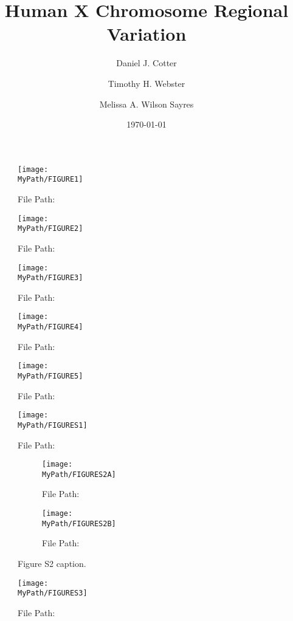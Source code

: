 \documentclass[12pt]{article}
\title{Human X Chromosome Regional Variation}
\author[1]{Daniel J. Cotter}
\author[1]{Timothy H. Webster}
\author[1]{Melissa A. Wilson Sayres}
\affil[1]{Arizona State University}
\date{\today}
\newcommand*{\MyPath}{..}
\newcommand{\beginsupplement}{%
        \setcounter{table}{0}
        \renewcommand{\thetable}{S\arabic{table}}%
        \setcounter{figure}{0}
        \renewcommand{\thefigure}{S\arabic{figure}}%
     }
\begin{document}
\maketitle

\begin{abstract}

\end{abstract}

\begin{figure}
  \texttt{[image: \\MyPath/FIGURE1]}
  \caption{File Path: {\tiny\texttt{}}}
  \label{fig:fig1}
\end{figure}

\begin{figure}
  \texttt{[image: \\MyPath/FIGURE2]}
  \caption{File Path: {\tiny\texttt{}}}
  \label{fig:fig2}
\end{figure}

\begin{figure}
  \texttt{[image: \\MyPath/FIGURE3]}
  \caption{File Path: {\tiny\texttt{}}}
  \label{fig:fig3}
\end{figure}

\begin{figure}
  \texttt{[image: \\MyPath/FIGURE4]}
  \caption{File Path: {\tiny\texttt{}}}
  \label{fig:fig4}
\end{figure}

\begin{figure}
  \texttt{[image: \\MyPath/FIGURE5]}
  \caption{File Path: {\tiny\texttt{}}}
  \label{fig:fig5}
\end{figure}

\beginsupplement

\begin{figure}
  \texttt{[image: \\MyPath/FIGURES1]}
  \caption{File Path: {\tiny\texttt{}}}
  \label{fig:figS1}
\end{figure}

\begin{figure}[h!]
  \centering
  \begin{subfigure}[b]{0.4\linewidth}
    \texttt{[image: \\MyPath/FIGURES2A]}
    \caption{File Path: {\tiny\texttt{}}}
  \end{subfigure}
  \begin{subfigure}[b]{0.4\linewidth}
    \texttt{[image: \\MyPath/FIGURES2B]}
    \caption{File Path: {\tiny\texttt{}}}
  \end{subfigure}
  \caption{Figure S2 caption.}
  \label{fig:figS2}
\end{figure}

\begin{figure}
  \texttt{[image: \\MyPath/FIGURES3]}
  \caption{File Path: {\tiny\texttt{}}}
  \label{fig:figS3}
\end{figure}
\end{document}
